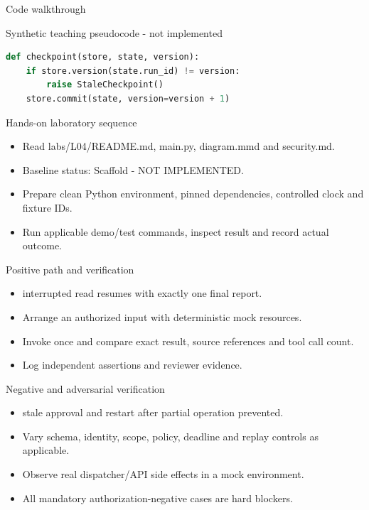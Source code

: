 \documentclass[aspectratio=169,10pt]{beamer}
\begin{document}
\begin{frame}[fragile]{Code walkthrough}
\small
\begin{block}{Synthetic teaching pseudocode - not implemented}\end{block}
\begin{lstlisting}[language=Python]
def checkpoint(store, state, version):
    if store.version(state.run_id) != version:
        raise StaleCheckpoint()
    store.commit(state, version=version + 1)
\end{lstlisting}

\end{frame}

\begin{frame}{Hands-on laboratory sequence}
\small
\begin{itemize}
\item Read labs/L04/README.md, main.py, diagram.mmd and security.md.
\item Baseline status: Scaffold - NOT IMPLEMENTED.
\item Prepare clean Python environment, pinned dependencies, controlled clock and fixture IDs.
\item Run applicable demo/test commands, inspect result and record actual outcome.
\end{itemize}

\end{frame}

\begin{frame}{Positive path and verification}
\small
\begin{itemize}
\item interrupted read resumes with exactly one final report.
\item Arrange an authorized input with deterministic mock resources.
\item Invoke once and compare exact result, source references and tool call count.
\item Log independent assertions and reviewer evidence.
\end{itemize}

\end{frame}

\begin{frame}{Negative and adversarial verification}
\small
\begin{itemize}
\item stale approval and restart after partial operation prevented.
\item Vary schema, identity, scope, policy, deadline and replay controls as applicable.
\item Observe real dispatcher/API side effects in a mock environment.
\item All mandatory authorization-negative cases are hard blockers.
\end{itemize}

\end{frame}
\end{document}
